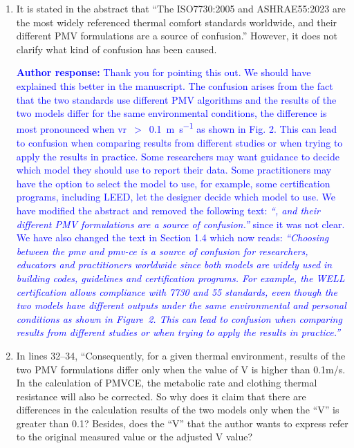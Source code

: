 \documentclass[a4paper, 10pt]{letter}
\newcommand{\response}[1]{\textcolor{blue}{\textbf{Author response:} #1}}
\begin{document}
\begin{letter}
\begin{enumerate}
            \response{We aimed to determine and compare the accuracy of the \ac{pmv} models implemented in the ISO 7730:2005 and ASHRAE 55:2023 standards. 
            We did not plan to assess the accuracy of the original Professor Fanger model. 
            As far as we know, the ISO 7730:2005 implementation is closer to the original model than the ASHRAE 55:2023.
            }

            \item It is stated in the abstract that ``The ISO7730:2005 and ASHRAE55:2023 are the most widely referenced thermal comfort standards worldwide, and their different PMV formulations are a source of confusion.''
            However, it does not clarify what kind of confusion has been caused.

            \response{Thank you for pointing this out.
            We should have explained this better in the manuscript.
            The confusion arises from the fact that the two standards use different PMV algorithms and the results of the two models differ for the same environmental conditions, the difference is most pronounced when \ac{vr}~$>$~\qty{0.1}{\m\per\s} as shown in Fig. 2.
            This can lead to confusion when comparing results from different studies or when trying to apply the results in practice. 
            Some researchers may want guidance to decide which model they should use to report their data. 
            Some practitioners may have the option to select the model to use, for example, some certification programs, including LEED, let the designer decide which model to use. 
            We have modified the abstract and removed the following text: \textit{``, and their different PMV formulations are a source of confusion.''} since it was not clear.
            We have also changed the text in Section 1.4 which now reads: \textit{``Choosing between the \ac{pmv} and \ac{pmv-ce} is a source of confusion for researchers, educators and practitioners worldwide since both models are widely used in building codes, guidelines and certification programs.
            For example, the WELL certification allows compliance with \gls{7730} and \gls{55} standards, even though the two models have different outputs under the same environmental and personal conditions as shown in Figure~2. This can lead to confusion when comparing results from different studies or when trying to apply the results in practice.''}
            }

            \item In lines 32--34, ``Consequently, for a given thermal environment, results of the two PMV formulations differ only when the value of V is higher than 0.1m/s.
            In the calculation of PMVCE, the metabolic rate and clothing thermal resistance will also be corrected.
            So why does it claim that there are differences in the calculation results of the two models only when the ``V'' is greater than 0.1?
            Besides, does the ``V'' that the author wants to express refer to the original measured value or the adjusted V value?


\end{enumerate}
\end{letter}
\end{document}
